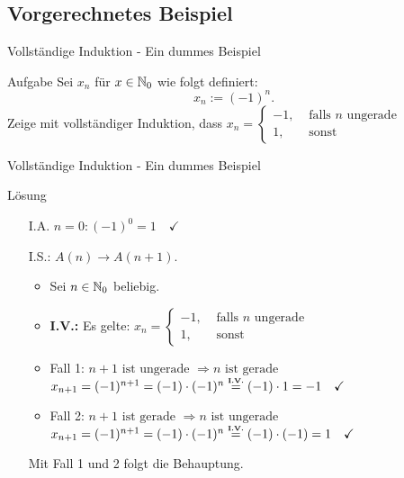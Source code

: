 \subsection{Vorgerechnetes Beispiel}
\begin{frame}{Vollständige Induktion - Ein dummes Beispiel}
	\begin{exampleblock}{Aufgabe}
		Sei $x_n$ für $x \in \mathbb{N}_0$ wie folgt definiert:
		\[
			x_n := (-1)^n.
		\]
		Zeige mit vollständiger Induktion, dass 
		$x_n = 
		\begin{cases}
			-1, &\text{ falls $n$ ungerade}\\
			1, &\text{ sonst}
		\end{cases}$
	\end{exampleblock}
\end{frame}
\begin{frame}{Vollständige Induktion - Ein dummes Beispiel}
	\begin{block}{Lösung}
		\begin{itemize}
			\item[I.A.] $n=0: (-1)^0=1 \quad \checkmark$
			\item[I.S.:] $A(n) \rightarrow A(n+1)$.\\
			\begin{itemize}
				\item Sei $n \in \mathbb{N}_{0}$ beliebig.
				\item \textbf{I.V.:} Es gelte: 
				 			$x_n = 
					\begin{cases}
						-1, &\text{ falls $n$ ungerade}\\
						1, &\text{ sonst}
					\end{cases}$\\[1.5em]
				\item Fall 1: $n+1 \text{ ist ungerade } \Rightarrow n \text{ ist gerade}$\\
					$x_{n+1} = (-1)^{n+1} = (-1) \cdot (-1)^n \eqtext{\textbf{I.V.}} (-1) \cdot 1 = -1 \quad \checkmark$
				\item Fall 2: $n+1 \text{ ist gerade } \Rightarrow n \text{ ist ungerade}$\\
					$x_{n+1} = (-1)^{n+1} = (-1) \cdot (-1)^n \eqtext{\textbf{I.V.}} (-1) \cdot (-1) = 1 \quad \checkmark$
			\end{itemize}
			Mit Fall 1 und 2 folgt die Behauptung. \qedwhite{}
		\end{itemize}
	\end{block}
\end{frame}